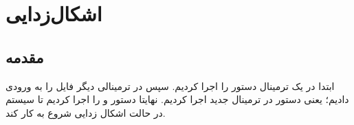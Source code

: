 \section*{اشکال‌زدایی}
\subsection*{مقدمه}

	ابتدا در یک ترمینال دستور 
	را اجرا کردیم. سپس در ترمینالی دیگر فایل 
	را به ورودی 
	دادیم؛ یعنی دستور 
	در ترمینال جدید اجرا کردیم. نهایتا دستور 
	و 
	را اجرا کردیم تا سیستم در حالت اشکال زدایی شروع به کار کند. 
	
	\begin{latin}
	
	
	\end{latin}


